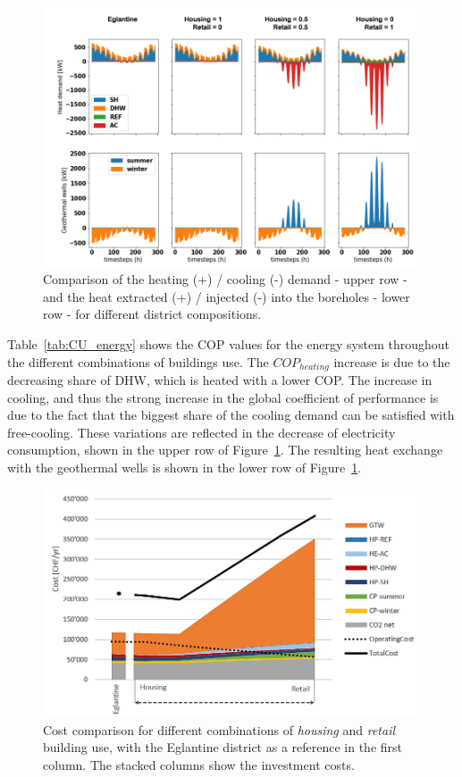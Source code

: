 \documentclass{article}
\begin{document}
\begin{figure}[tph]
	\centering
	\includegraphics[width=1\linewidth]{Images/CU}
	\caption{Comparison of the heating (+) / cooling (-) demand - upper row - and the heat extracted (+) / injected (-) into the boreholes - lower row - for different district compositions.}
	\label{fig:cu}
\end{figure}

Table~\ref{tab:CU_energy} shows the COP values for the energy system throughout the different combinations of buildings use. The $COP_{heating}$ increase is due to the decreasing share of DHW, which is heated with a lower COP. The increase in cooling, and thus the strong increase in the global coefficient of performance is due to the fact that the biggest share of the cooling demand can be satisfied with free-cooling. These variations are reflected in the decrease of electricity consumption, shown in the upper row of Figure~\ref{fig:cu}. The resulting heat exchange with the geothermal wells is shown in the lower row of Figure~\ref{fig:cu}.

\begin{figure}[htp]
	\centering
	\includegraphics[width=1\textwidth]{CU_SA_TC.png}
	\caption{Cost comparison for different combinations of \textit{housing} and \textit{retail} building use, with the Eglantine district as a reference in the first column. The stacked columns show the investment costs.}
	\label{fig:CU_TC}
\end{figure}
\end{document}
